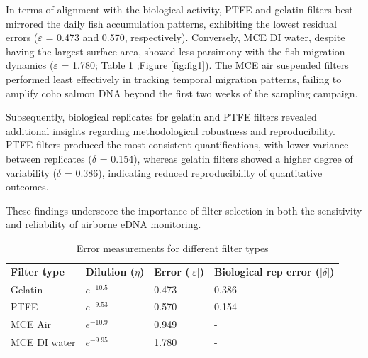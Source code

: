 \documentclass{article}
\begin{document}

In terms of alignment with the biological activity, PTFE and gelatin filters best mirrored the daily fish accumulation patterns, exhibiting the lowest residual errors ($\varepsilon$ = 0.473 and 0.570, respectively).  Conversely, MCE DI water, despite having the largest surface area, showed less parsimony with the fish migration dynamics ($\varepsilon$ = 1.780; Table \ref{tab:filter_error} ;Figure \ref{fig:fig1}). The MCE air suspended filters performed least effectively in tracking temporal migration patterns, failing to amplify coho salmon DNA beyond the first two weeks of the sampling campaign.

Subsequently, biological replicates for gelatin and PTFE filters revealed additional insights regarding methodological robustness and reproducibility. PTFE filters produced the most consistent quantifications, with lower variance between replicates ($\delta$ = 0.154), whereas gelatin filters showed a higher degree of variability ($\delta$ = 0.386), indicating reduced reproducibility of quantitative outcomes. 

These findings underscore the importance of filter selection in both the sensitivity and reliability of airborne eDNA monitoring.

\begin{table}[h!]
\centering
\caption{Error measurements for different filter types}
\label{tab:filter_error}
\begin{tabular}{llll}
\textbf{Filter type} & \textbf{Dilution ($\eta$)} & \textbf{Error ($\overline{|\varepsilon|}$)} & \textbf{Biological rep error ($\overline{|\delta|}$)} \\
Gelatin & $e^{-10.5}$ & 0.473 & 0.386 \\
PTFE & $e^{-9.53}$ & 0.570 & 0.154 \\
MCE Air & $e^{-10.9}$ & 0.949 & - \\
MCE DI water & $e^{-9.95}$ & 1.780  & - \\
\end{tabular}
\end{table}
\end{document}
